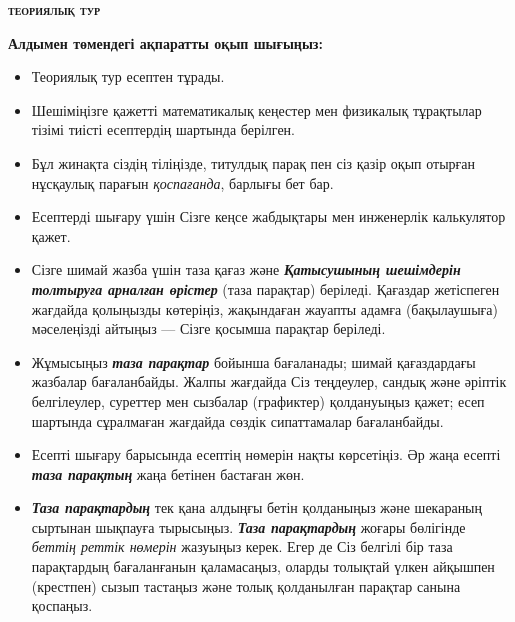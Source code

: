 \thispagestyle{empty}
\begin{center}
    \LARGE\textbf{\scshape{теориялық тур}}%
\end{center}
%
\vspace{2pt}%
%
\begin{center}
    \large{}
\end{center}
\vspace{2pt}
\begin{center}
    \large\textbf{Алдымен төмендегі ақпаратты оқып шығыңыз:}
\end{center}
\vspace{4pt}
\begin{itemize}[leftmargin=*]
    \item Теориялық тур  есептен тұрады.
    \item Шешіміңізге қажетті математикалық кеңестер мен физикалық тұрақтылар тізімі тиісті есептердің шартында берілген.
    \item Бұл жинақта сіздің тіліңізде, титулдық парақ пен сіз қазір оқып отырған нұсқаулық парағын \textit{қоспағанда}, барлығы \pageref{LastPage} бет бар.
    \item Есептерді шығару үшін Сізге кеңсе жабдықтары мен инженерлік калькулятор қажет.
    \item Сізге шимай жазба үшін таза қағаз және \textbf{\textit{Қатысушының шешімдерін толтыруға арналған өрістер}} (таза парақтар) беріледі. Қағаздар жетіспеген жағдайда қолыңызды көтеріңіз, жақындаған жауапты адамға (бақылаушыға) мәселеңізді айтыңыз --- Сізге қосымша парақтар беріледі.
    \item Жұмысыңыз \textbf{\textit{таза парақтар}} бойынша бағаланады; шимай қағаздардағы жазбалар бағаланбайды. Жалпы жағдайда Сіз теңдеулер, сандық және әріптік белгілеулер, суреттер мен сызбалар (графиктер) қолдануыңыз қажет; есеп шартында сұралмаған жағдайда сөздік сипаттамалар бағаланбайды.
    \item Есепті шығару барысында есептің нөмерін нақты көрсетіңіз. Әр жаңа есепті \textbf{\textit{таза парақтың}} жаңа бетінен бастаған жөн.
    \item \textbf{\textit{Таза парақтардың}} тек қана алдыңғы бетін қолданыңыз және шекараның сыртынан шықпауға тырысыңыз. \textbf{\textit{Таза парақтардың}} жоғары бөлігінде \textit{беттің реттік нөмерін} жазуыңыз керек. Егер де Сіз белгілі бір таза парақтардың бағаланғанын қаламасаңыз, оларды толықтай үлкен айқышпен (крестпен) сызып тастаңыз және толық қолданылған парақтар санына қоспаңыз.

\end{itemize}

